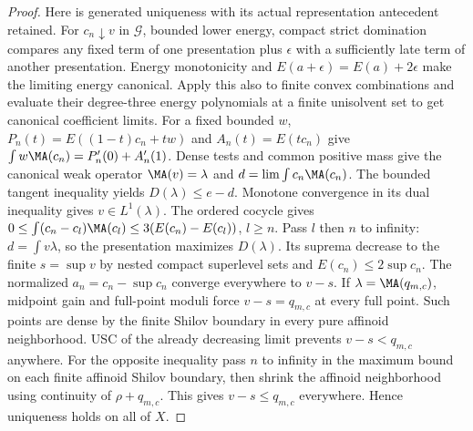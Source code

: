 \begin{proof}
Here is generated uniqueness with its actual representation antecedent
retained. For $c_n\downarrow v$ in $\mathcal G$, bounded lower energy,
compact strict domination compares any fixed term of one presentation
plus $\epsilon$ with a sufficiently late term of another presentation.
Energy monotonicity and $E(a+\epsilon)=E(a)+2\epsilon$ make the
limiting energy canonical. Apply this also to finite convex combinations
and evaluate their degree-three energy polynomials at a finite unisolvent
set to get canonical coefficient limits. For a fixed bounded $w$,
$P_n(t)=E((1-t)c_n+tw)$ and $A_n(t)=E(tc_n)$ give
$\int w\MA(c_n)=P'_n(0)+A'_n(1)$.
Dense tests and common positive mass give the canonical weak operator
$\MA(v)=\lambda$ and $d=\lim\int c_n\MA(c_n)$.
The bounded tangent inequality yields $D(\lambda)\le e-d$.
Monotone convergence in its dual inequality gives $v\in L^1(\lambda)$.
The ordered cocycle gives
$0\le\int(c_n-c_l)\MA(c_l)\le3(E(c_n)-E(c_l))$, $l\ge n$.
Pass $l$ then $n$ to infinity: $d=\int v\lambda$, so the presentation
maximizes $D(\lambda)$.
Its suprema decrease to the finite $s=\sup v$ by nested compact
superlevel sets and $E(c_n)\le2\sup c_n$.
The normalized $a_n=c_n-\sup c_n$ converge everywhere to $v-s$.
If $\lambda=\MA(q_{m,c})$, midpoint gain and full-point moduli force
$v-s=q_{m,c}$ at every full point. Such points are dense by the
finite Shilov boundary in every pure affinoid neighborhood.
USC of the already decreasing limit prevents $v-s<q_{m,c}$ anywhere.
For the opposite inequality pass $n$ to infinity in the maximum bound
on each finite affinoid Shilov boundary, then shrink the affinoid
neighborhood using continuity of $\rho+q_{m,c}$. This gives
$v-s\le q_{m,c}$ everywhere. Hence uniqueness holds on all of $X$.
\end{proof}

